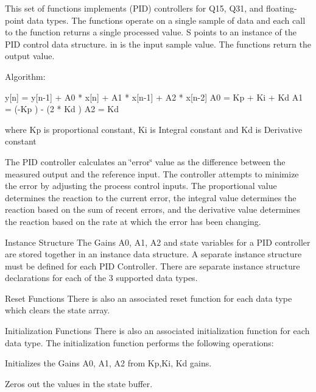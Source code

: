 This set of functions implements (P\+ID) controllers for Q15, Q31, and floating-\/point data types. The functions operate on a single sample of data and each call to the function returns a single processed value. {\ttfamily S} points to an instance of the P\+ID control data structure. {\ttfamily in} is the input sample value. The functions return the output value.

\begin{DoxyParagraph}{Algorithm\+:}

\begin{DoxyPre}
   y[n] = y[n-1] + A0 * x[n] + A1 * x[n-1] + A2 * x[n-2]
   A0 = Kp + Ki + Kd
   A1 = (-Kp ) - (2 * Kd )
   A2 = Kd  \end{DoxyPre}

\end{DoxyParagraph}
\begin{DoxyParagraph}{}
where {\ttfamily Kp} is proportional constant, {\ttfamily Ki} is Integral constant and {\ttfamily Kd} is Derivative constant
\end{DoxyParagraph}
\begin{DoxyParagraph}{}
 
\end{DoxyParagraph}
\begin{DoxyParagraph}{}
The P\+ID controller calculates an \char`\"{}error\char`\"{} value as the difference between the measured output and the reference input. The controller attempts to minimize the error by adjusting the process control inputs. The proportional value determines the reaction to the current error, the integral value determines the reaction based on the sum of recent errors, and the derivative value determines the reaction based on the rate at which the error has been changing.
\end{DoxyParagraph}
\begin{DoxyParagraph}{Instance Structure}
The Gains A0, A1, A2 and state variables for a P\+ID controller are stored together in an instance data structure. A separate instance structure must be defined for each P\+ID Controller. There are separate instance structure declarations for each of the 3 supported data types.
\end{DoxyParagraph}
\begin{DoxyParagraph}{Reset Functions}
There is also an associated reset function for each data type which clears the state array.
\end{DoxyParagraph}
\begin{DoxyParagraph}{Initialization Functions}
There is also an associated initialization function for each data type. The initialization function performs the following operations\+:
\begin{DoxyItemize}
\item Initializes the Gains A0, A1, A2 from Kp,Ki, Kd gains.
\item Zeros out the values in the state buffer.
\end{DoxyItemize}
\end{DoxyParagraph}
